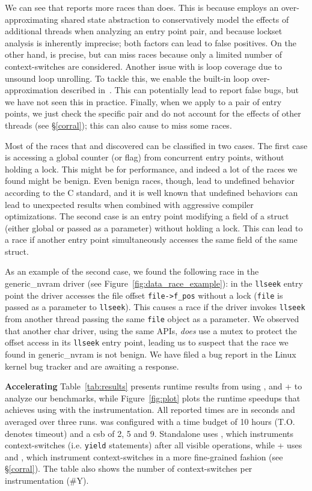 We can see that \whoop reports more races than \corral does. This is because \whoop employs an over-approximating shared state abstraction to conservatively model the effects of additional threads when analyzing an entry point pair, and because lockset analysis is inherently imprecise; both factors can lead to false positives.  On the other hand, \corral is precise, but can miss races because only a limited number of context-switches are considered.  Another issue with \corral is loop coverage due to unsound loop unrolling. To tackle this, we enable the built-in loop over-approximation described in~\cite{lal2014powering}. This can potentially lead \corral to report false bugs, but we have not seen this in practice. Finally, when we apply \corral to a pair of entry points, we just check the specific pair and do not account for the effects of other threads (see \S\ref{corral}); this can also cause \corral to miss some races.

Most of the races that \whoop and \corral discovered can be classified in two cases. The first case is accessing a global counter (or flag) from concurrent entry points, without holding a lock. This might be for performance, and indeed a lot of the races we found might be benign. Even benign races, though, lead to undefined behavior according to the C standard, and it is well known that undefined behaviors can lead to unexpected results when combined with aggressive compiler optimizations. The second case is an entry point modifying a field of a struct (either global or passed as a parameter) without holding a lock. This can lead to a race if another entry point simultaneously accesses the same field of the same struct.

As an example of the second case, we found the following race in the generic\_nvram driver (see Figure~\ref{fig:data_race_example}): in the \texttt{llseek} entry point the driver accesses the file offset \texttt{file->f\_pos} without a lock (\texttt{file} is passed as a parameter to \texttt{llseek}). This causes a race if the driver invokes \texttt{llseek} from another thread passing the same \texttt{file} object as a parameter.  We observed that another char driver, using the same APIs, \emph{does} use a mutex to protect the offset access in its \texttt{llseek} entry point, leading us to suspect that the race we found in generic\_nvram is not benign.  We have filed a bug report in the Linux kernel bug tracker and are awaiting a response.

\noindent\textbf{Accelerating \corral }
%
Table~\ref{tab:results} presents runtime results from using \whoop, \corral and \whoop + \corral to analyze our benchmarks, while Figure~\ref{fig:plot} plots the runtime speedups that \corral achieves using \whoop with the \yieldmr instrumentation. All reported times are in seconds and averaged over three runs. \corral was configured with a time budget of 10 hours (T.O. denotes timeout) and a csb of 2, 5 and 9. Standalone \corral uses \yieldall, which instruments context-switches (i.e. \texttt{yield} statements) after all visible operations, while \whoop + \corral uses \yieldcoarse and \yieldmr, which instrument context-switches in a more fine-grained fashion (see \S\ref{corral}). The table also shows the number of context-switches per instrumentation (\#Y).

